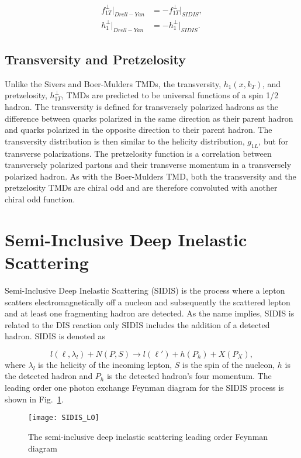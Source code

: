 \begin{align}
  f_{1T}^{\bot} |_{Drell-Yan} &= - f_{1T}^{\bot} |_{SIDIS}, \\
  h_{1}^{\bot} |_{Drell-Yan} &= - h_{1}^{\bot} |_{SIDIS}.
\end{align}

\subsection{Transversity and Pretzelosity}
Unlike the Sivers and Boer-Mulders TMDs, the transversity, $h_1(x, k_T)$, and
pretzelosity, $h_{1T}^{\bot}$, TMDs are predicted to be universal functions of a
spin 1/2 hadron.  The transversity is defined for transversely polarized hadrons
as the difference between quarks polarized in the same direction as their parent
hadron and quarks polarized in the opposite direction to their parent hadron.
The transversity distribution is then similar to the helicity distribution,
$g_{1L}$, but for transverse polarizations.  The pretzelosity function is a
correlation between transversely polarized partons and their transverse momentum
in a transversely polarized hadron.  As with the Boer-Mulders TMD, both the
transversity and the pretzelosity TMDs are chiral odd and are therefore
convoluted with another chiral odd function.


\section{Semi-Inclusive Deep Inelastic Scattering} \label{sec::SIDIS}
Semi-Inclusive Deep Inelastic Scattering (SIDIS) is the process where a lepton
scatters electromagnetically off a nucleon and subsequently the scattered lepton
and at least one fragmenting hadron are detected.  As the name implies, SIDIS is
related to the DIS reaction only SIDIS includes the addition of a detected
hadron.  SIDIS is denoted as

\begin{equation}
  l(\ell, \lambda_l) + N(P, S) \rightarrow l(\ell') + h(P_h) + X(P_X),
\end{equation}
\noindent
where $\lambda_l$ is the helicity of the incoming lepton, $S$ is the spin of the
nucleon, $h$ is the detected hadron and $P_h$ is the detected hadron's four
momentum.  The leading order one photon exchange Feynman diagram for the SIDIS
process is shown in Fig.~\ref{fig::SIDIS_LO}.

\begin{figure}[h!t]
  \centering
  \texttt{[image: SIDIS\_LO]}
  \caption{The semi-inclusive deep inelastic scattering leading order Feynman
    diagram}
  \label{fig::SIDIS_LO}
\end{figure}

